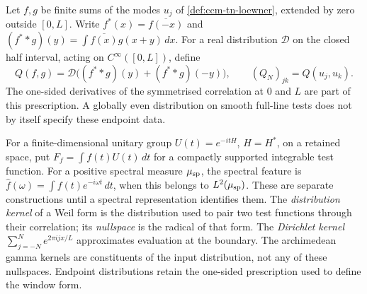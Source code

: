 \begin{definition}
\label{def:ccm-tn-window-form}
Let $f,g$ be finite sums of the modes $u_j$ of
\cref{def:ccm-tn-loewner}, extended by zero outside $[0,L]$.
Write $f^*(x)=\overline{f(-x)}$ and
$(f^**g)(y)=\int\overline{f(x)}g(x+y)\,dx$.
For a real distribution $\mathcal D$ on the closed half interval,
acting on $C^\infty([0,L])$, define
\[
 Q(f,g)=\mathcal D\bigl((f^**g)(y)+(f^**g)(-y)\bigr),\qquad
 (Q_N)_{jk}=Q(u_j,u_k).
\]
The one-sided derivatives of the symmetrised correlation at $0$ and
$L$ are part of this prescription. A globally even distribution on
smooth full-line tests does not by itself specify these endpoint data.
\end{definition}

\begin{definition}
\label{def:ccm-tn-continuous}
For a finite-dimensional unitary group $U(t)=e^{-itH}$, $H=H^*$, on a retained space, put
$F_f=\int f(t)U(t)\,dt$ for a compactly supported integrable test function.
For a positive spectral measure $\mu_{\mathrm{sp}}$, the spectral feature is
$\widehat f(\omega)=\int f(t)e^{-i\omega t}\,dt$, when this belongs
to $L^2(\mu_{\mathrm{sp}})$. These are separate constructions until a spectral
representation identifies them.
The \emph{distribution kernel} of a Weil form is the distribution used
to pair two test functions through their correlation; its
\emph{nullspace} is the radical of that form. The \emph{Dirichlet kernel}
$\sum_{j=-N}^N e^{2\pi ijx/L}$ approximates evaluation at the boundary.
The archimedean gamma kernels are constituents of the input distribution,
not any of these nullspaces. Endpoint distributions retain the one-sided
prescription used to define the window form.
\end{definition}
